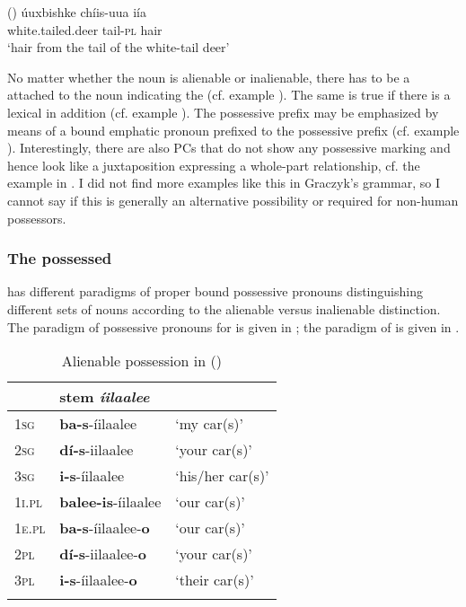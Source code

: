\documentclass[output=paper]{LSP/langsci}
\begin{document}
\ea {} (\citealt[236]{Graczyk2007}) \label{crowdeer}
\ex 
\gll úuxbishke            chíis-uua iía \\
white.tailed.deer tail-\textsc{pl}      hair \\
\glt `hair from the tail of the white-tail deer'
\z \z

No matter whether the  noun is alienable or inalienable, there has to be a  attached to the  noun indicating the  (cf. example ). The same is true if there is a lexical  in addition (cf. example ). The possessive prefix may be emphasized by means of a bound emphatic pronoun prefixed to the possessive prefix (cf. example ). Interestingly, there are also PCs that do not show any possessive marking and hence look like a juxtaposition expressing a whole-part relationship, cf. the example in . I did not find more examples like this in Graczyk's grammar, so I cannot say if this is generally an alternative possibility or required for non-human possessors.

\subsubsection{The possessed}
 has different paradigms of proper bound possessive pronouns distinguishing different sets of  nouns according to the alienable versus inalienable distinction. The paradigm of possessive pronouns for  is given in ; the paradigm of  is given in .

\begin{table}
\caption{Alienable possession in  (\citealt[53]{Graczyk2007})} \label{crowalienablepossession}
\begin{tabular}{ l l l}
\lsptoprule
& stem \textit{íilaalee} & \\
\midrule 	
\textsc{1sg} & \textbf{ba-s}-íilaalee	& `my car(s)' \\
 
\textsc{2sg} & \textbf{dí-s}-iilaalee & `your car(s)' \\
 
\textsc{3sg} & \textbf{i-s}-íilaalee & `his/her car(s)' \\
 
\textsc{1i.pl} & \textbf{balee-is}-íilaalee & `our car(s)' \\
 
\textsc{1e.pl} & \textbf{ba-s}-íilaalee-\textbf{o} & `our car(s)' \\
 
\textsc{2pl} & \textbf{dí-s}-iilaalee-\textbf{o} & `your car(s)' \\
 
\textsc{3pl} & \textbf{i-s}-íilaalee-\textbf{o} & `their car(s)' \\
\lspbottomrule
\end{tabular}
\end{table}
\end{document}
